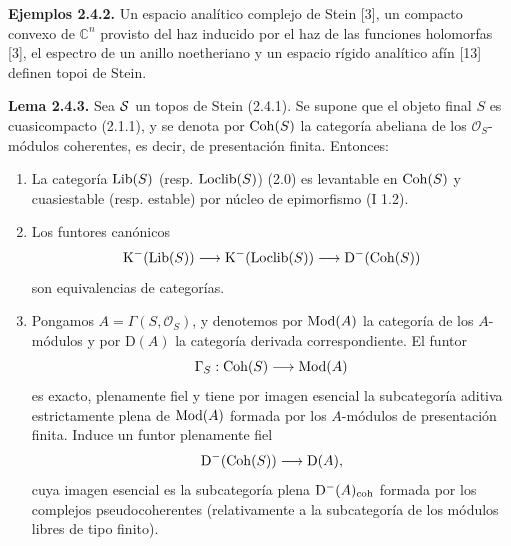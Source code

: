 \textbf{Ejemplos 2.4.2.} Un espacio analítico complejo de Stein [3], un compacto convexo de $\mathbb C^n$ provisto del haz inducido por el haz de las funciones holomorfas [3], el espectro de un anillo noetheriano y un espacio rígido analítico afín [13] definen topoi de Stein.

\textbf{Lema 2.4.3.} Sea $\sisi{S}{\mathcal S}$ un topos de Stein (2.4.1). Se supone que el objeto final $S$ es cuasicompacto (2.1.1), y se denota por $\Coh(S)$ la categoría abeliana de los $\mathcal O_S$-módulos coherentes, es decir, de presentación finita. Entonces:
\begin{enumerate}[label=\alph*)]
\item La categoría $\Lib(S)$ (resp. $\Loclib(S)$) (2.0) es levantable en $\Coh(S)$ y cuasiestable (resp. estable) por núcleo de epimorfismo (I 1.2).
\item Los funtores canónicos
\[
\mathrm K^{-}(\Lib(S))\longrightarrow\mathrm K^{-}(\Loclib(S))\longrightarrow\mathrm D^{-}(\Coh(S))
\]
son equivalencias de categorías.
\item Pongamos $A=\Gamma(S,\mathcal O_S)$, y denotemos por $\Mod(A)$ la categoría de los $A$-módulos y por $\mathrm D(A)$ la categoría derivada correspondiente. El funtor
\[
\Gamma_S:\Coh(S)\longrightarrow\Mod(A)
\]
es exacto, plenamente fiel y tiene por imagen esencial la subcategoría aditiva estrictamente plena de $\Mod(A)$ formada por los $A$-módulos de presentación finita. Induce un funtor plenamente fiel
\[
\mathrm D^{-}(\Coh(S))\longrightarrow\mathrm D(A),
\]
cuya imagen esencial es la subcategoría plena $\mathrm D^{-}(A)_{\coh}$ formada por los complejos pseudocoherentes (relativamente a la subcategoría de los módulos libres de tipo finito).
\end{enumerate}

